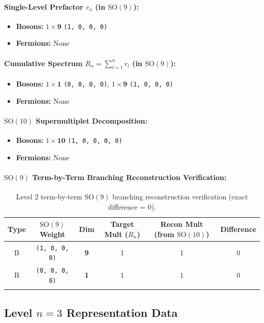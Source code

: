 \documentclass[11pt,a4paper]{article}
\begin{document}
\paragraph{Single-Level Prefactor $r_n$ (in $\mathrm{SO}(9)$):}
\begin{itemize}
    \item \textbf{Bosons:} $1 \times \mathbf{9}$ \texttt{(1, 0, 0, 0)}
    \item \textbf{Fermions:} None
\end{itemize}
\paragraph{Cumulative Spectrum $R_n = \sum_{l=1}^n r_l$ (in $\mathrm{SO}(9)$):}
\begin{itemize}
    \item \textbf{Bosons:} $1 \times \mathbf{1}$ \texttt{(0, 0, 0, 0)}, $1 \times \mathbf{9}$ \texttt{(1, 0, 0, 0)}
    \item \textbf{Fermions:} None
\end{itemize}
\paragraph{$\mathrm{SO}(10)$ Supermultiplet Decomposition:}
\begin{itemize}
    \item \textbf{Bosons:} $1 \times \mathbf{10}$ \texttt{(1, 0, 0, 0, 0)}
    \item \textbf{Fermions:} None
\end{itemize}
\paragraph{$\mathrm{SO}(9)$ Term-by-Term Branching Reconstruction Verification:}
\begin{longtable}{@{}cccccc@{}}
\toprule
Type & $\mathrm{SO}(9)$ Weight & Dim & Target Mult ($R_n$) & Recon Mult (from $\mathrm{SO}(10)$) & Difference \\
\midrule
\endhead
B & \texttt{(1, 0, 0, 0)} & \textbf{9} & 1 & 1 & 0 \\
B & \texttt{(0, 0, 0, 0)} & \textbf{1} & 1 & 1 & 0 \\
\bottomrule
\caption{Level 2 term-by-term $\mathrm{SO}(9)$ branching reconstruction verification (exact difference = 0).}
\end{longtable}

\subsection{Level $n = 3$ Representation Data}
\end{document}
